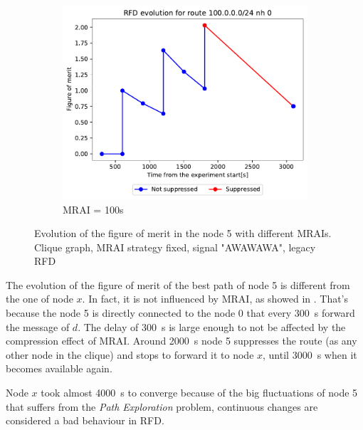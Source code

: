 \begin{figure}[h]
\begin{subfigure}[b]{0.49\textwidth}
         \label{fig:clique_5_mrai50}
     \end{subfigure}
     \hfill
     \begin{subfigure}[b]{0.49\textwidth}
         \centering
         \includegraphics[width=\textwidth]{images/RFD/clique/FigureOfMerit/mrai21_RFD_5_rfd_R1.pdf}
         \caption{MRAI = 100s}
         \label{fig:clique_5_mrai100}
     \end{subfigure}
		\caption{Evolution of the figure of merit in the node \num{5} with different MRAIs.
		Clique graph, MRAI strategy fixed, signal "AWAWAWA", legacy RFD}
        \label{fig:clique_node5}
\end{figure}

The evolution of the figure of merit of the best path of node \num{5} is different
from the one of node $x$.
In fact, it is not influenced by \ac{MRAI}, as showed in .
That's because the node \num{5} is directly connected to the node \num{0} that every
\SI{300}{\second} forward the message of $d$. The delay of \SI{300}{\second} is large
enough to not be affected by the compression effect of \ac{MRAI}.
Around \SI{2000}{\second} node \num{5} suppresses the route (as any other node in the
clique) and stops to forward it to node $x$, until \SI{3000}{\second} when it becomes
available again.

Node $x$ took almost \SI{4000}{\second} to converge because of the big fluctuations
of node \num{5} that suffers from the \textit{Path Exploration} problem, continuous
changes are considered a bad behaviour in \ac{RFD}.

